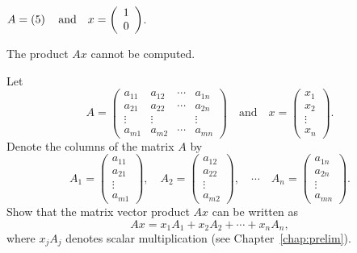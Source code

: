 \documentclass{ximera}
\begin{document}
\begin{exercise} \label{c4.1.a3d}
  $A=\left(5\right) \quad\mbox{and}\quad x = \left(\begin{array}{r} 1 \\ 0\end{array}\right)$.
  \begin{multipleChoice}
  \end{multipleChoice}  

  \begin{solution}
    The product $Ax$ cannot be computed.
  \end{solution}
  
\end{exercise}

\begin{exercise} \label{c4.1.b3}
Let
\[
A=\left(
\begin{array}{rrrr}
 a_{11} & a_{12} & \cdots & a_{1n} \\
 a_{21} & a_{22} & \cdots & a_{2n}  \\
 \vdots & \vdots &        & \vdots  \\
 a_{m1} & a_{m2} & \cdots & a_{mn}
\end{array}
\right)\quad\mbox{and}\quad
x =
\left( \begin{array}{r} x_1\\ x_2\\ \vdots\\ x_n\end{array}\right).
\]
Denote the columns of the matrix $A$ by
\[
A_1 =
\left(\begin{array}{c} a_{11}\\ a_{21}\\ \vdots\\
a_{m1}\end{array}\right),\quad
A_2 =
\left(\begin{array}{c} a_{12}\\ a_{22}\\ \vdots\\
a_{m2}\end{array}\right),\quad
\cdots\quad
A_n =
\left(\begin{array}{c} a_{1n}\\ a_{2n}\\ \vdots\\ a_{mn}\end{array}\right).
\]
Show that the matrix vector product $Ax$ can be written as
\[
Ax = x_1 A_1 + x_2 A_2 + \cdots + x_n A_n,
\]
where $x_j A_j$ denotes scalar multiplication (see Chapter~\ref{chap:prelim}).


\end{exercise}
\end{document}
